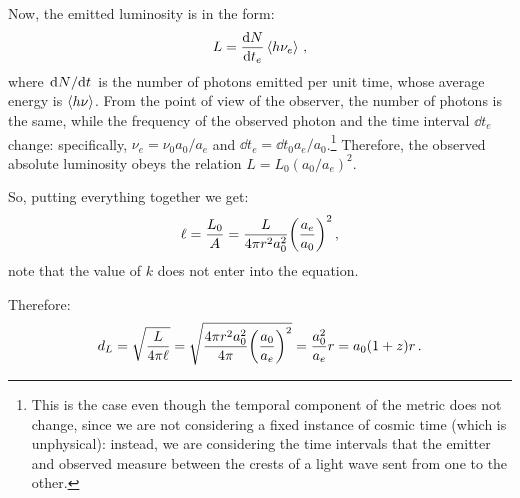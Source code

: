 \documentclass[main.tex]{subfiles}
\begin{document}
Now, the emitted luminosity is in the form: 
%
\begin{align}
L = \dv{N}{t_{e}} \expval{h \nu_{e} }
\,,
\end{align}
%
where \(\dv*{N}{t}\) is the number of photons emitted per unit time, whose average energy is \(\expval{h \nu }\).
From the point of view of the observer, the number of photons is the same, while the frequency of the observed photon and the time interval \(\dd{t_{e}}\) change: specifically, \(\nu_{e} = \nu_0 a_0 / a_e\) and \(\dd{t_{e}} = \dd{t_0 } a_e / a_0 \).\footnote{This is the case even though the temporal component of the metric does not change, since we are not considering a fixed instance of cosmic time (which is unphysical): instead, we are considering the time intervals that the emitter and observed measure between the crests of a light wave sent from one to the other.}
Therefore, the observed absolute luminosity obeys the relation \(L= L_0 (a_0 / a_e)^2 \).

So, putting everything together we get:
%
\begin{equation}
  \ell = \frac{L_0 }{A} 
  = \frac{L}{4 \pi r^2 a_0 ^2} \qty(\frac{a_e}{a_0}) ^2
  \,,
\end{equation}
%
note that the value of \(k\) does not enter into the equation.

Therefore:
%
\begin{equation} \label{eq:luminosity-distance}
d_L = \sqrt{\frac{L}{4 \pi \ell}}
= \sqrt{\frac{4 \pi r^2a_0^2}{4 \pi } \qty(\frac{a_0}{a_e})^2}
= \frac{a_0^2}{a_e} r = a_0  (1+z) r\,.
\end{equation}
\end{document}
